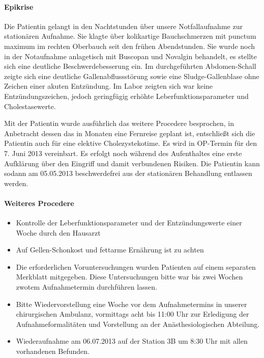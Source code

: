 \paragraph{Epikrise}

Die Patientin gelangt in den 
Nachtstunden über unsere Notfallaufnahme zur stationären
Aufnahme. Sie klagte über kolikartige Bauchschmerzen
mit punctum maximum im rechten Oberbauch seit den
frühen Abendstunden. Sie wurde noch in der Notaufnahme
anlagetisch mit Buscopan und Novalgin behandelt, es stellte sich eine deutliche
Beschwerdebesserung ein. Im durchgeführten Abdomen-Schall zeigte
sich eine deutliche Gallenabflussstörung sowie eine
Sludge-Gallenblase ohne Zeichen einer akuten Entzündung. 
Im Labor zeigten sich war keine
Entzündungszeichen, jedoch geringfügig erhöhte
Leberfunktionsparameter und Cholestasewerte. 

Mit der
Patientin wurde ausführlich das weitere Procedere
besprochen, in Anbetracht dessen das in   Monaten eine
Fernreise geplant ist, entschließt sich die Patientin auch
für eine elektive Cholezystekotime. Es wird in OP-Termin
für den 7. Juni 2013 vereinbart. Es erfolgt noch während des Aufenthaltes
eine erste Aufklärung über den Eingriff und damit
verbundenen Risiken. Die Patientin kann sodann am 05.05.2013
beschwerdefrei aus der stationären Behandlung entlassen werden.

\paragraph{Weiteres Procedere} 

\begin{itemize}
  \item Kontrolle der Leberfunktionsparameter und
der Entzündungswerte einer Woche durch den Hausarzt
\item Auf Gellen-Schonkost und fettarme Ernährung ist zu
achten
\item 
Die erforderlichen Voruntersuchungen wurden Patienten
auf einem separaten Merkblatt mitgegeben. Diese
Untersuchungen bitte war bis zwei Wochen zwotem
Aufnahmetermin durchführen lassen.
\item Bitte Wiedervorstellung
eine Woche vor dem Aufnahmetermins in unserer chirurgischen
Ambulanz, vormittags acht bis 11:00 Uhr zur Erledigung der
Aufnahmeformalitäten und Vorstellung an der
Anästhesiologischen Abteilung.
\item Wiederaufnahme am
06.07.2013 auf der Station 3B um 8:30 Uhr mit allen
vorhandenen Befunden.
\end{itemize}



